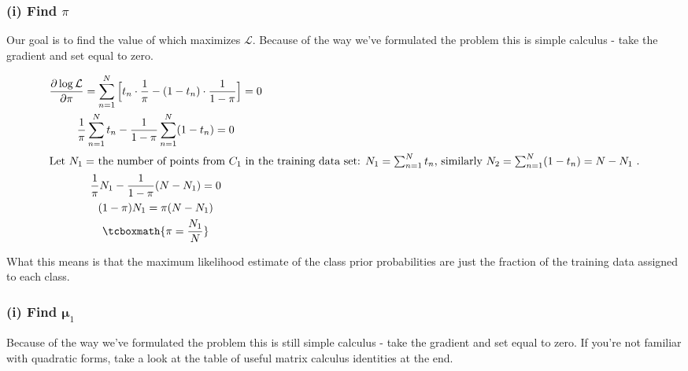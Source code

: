 \documentclass[11pt]{article}
\newcommand{\ub}{\symbf{\mu}}
\begin{document}
\begin{framed}
\subsubsection*{(i) Find $\pi$}
Our goal is to find the value of \pi which maximizes $\mathcal{L}$. Because of the way we've formulated the problem this is
simple calculus - take the gradient and set equal to zero.

\begin{gather*}
	\frac{\partial \log \mathcal{L}}{\partial \pi} = \sum_{n=1}^N \Big[ t_n \cdot \frac{1}{\pi} - (1 - t_n) \cdot \frac{1}{1 - \pi} \Big] = 0 \\
	\frac{1}{\pi} \sum_{n=1}^{N} t_n - \frac{1}{1-\pi} \sum_{n=1}^N (1 - t_n) = 0 \\
	\intertext{Let $N_1 = $ the number of points from $C_1$ in the training data set: $N_1 = \sum_{n=1}^N t_n$, similarly $N_2 = \sum_{n=1}^N (1 -  t_n) = N - N_1$ .}
	\frac{1}{\pi} N_1 - \frac{1}{1-\pi} (N - N_1) = 0 \\
	(1 - \pi) N_1 = \pi (N - N_1)  \\
	\tcboxmath{\pi = \frac{N_1}{N}}
\end{gather*}

What this means is that the maximum likelihood estimate of the class prior probabilities are just the fraction of the training data assigned to each class. 


\subsubsection*{(i) Find $\ub_1$}
 Because of the way we've formulated the problem this is still simple calculus - take the gradient and set equal to zero. 
 If you're not familiar with quadratic forms, take a look at the table of useful matrix calculus identities at the end.


\end{framed}
\end{document}
